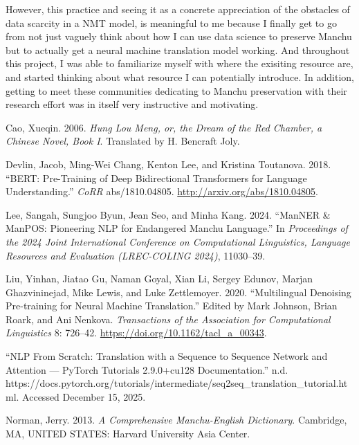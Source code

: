 \documentclass[
  letterpaper,
  DIV=11,
  numbers=noendperiod]{scrartcl}
\newlength{\cslhangindent}
\newenvironment{CSLReferences}[2] %
 {\begin{list}{}{%
  \setlength{\itemindent}{0pt}
  \setlength{\leftmargin}{0pt}
  \setlength{\parsep}{0pt}
  \ifodd #1
   \setlength{\leftmargin}{\cslhangindent}
   \setlength{\itemindent}{-1\cslhangindent}
  \fi
  \setlength{\itemsep}{#2\baselineskip}}}
 {\end{list}}
\begin{document}
However, this practice and seeing it as a concrete appreciation of the
obstacles of data scarcity in a NMT model, is meaningful to me because I
finally get to go from not just vaguely think about how I can use data
science to preserve Manchu but to actually get a neural machine
translation model working. And throughout this project, I was able to
familiarize myself with where the exisiting resource are, and started
thinking about what resource I can potentially introduce. In addition,
getting to meet these communities dedicating to Manchu preservation with
their research effort was in itself very instructive and motivating.

\label{refs}
\begin{CSLReferences}{1}{0}
Cao, Xueqin. 2006. \emph{Hung {Lou Meng}, or, the {Dream} of the {Red
Chamber}, a {Chinese Novel}, {Book I}}. Translated by H. Bencraft Joly.

Devlin, Jacob, Ming-Wei Chang, Kenton Lee, and Kristina Toutanova. 2018.
{``{BERT:} Pre-Training of Deep Bidirectional Transformers for Language
Understanding.''} \emph{CoRR} abs/1810.04805.
\url{http://arxiv.org/abs/1810.04805}.

Lee, Sangah, Sungjoo Byun, Jean Seo, and Minha Kang. 2024. {``{ManNER}
\& {ManPOS}: {Pioneering NLP} for Endangered {Manchu} Language.''} In
\emph{Proceedings of the 2024 {Joint International Conference} on
{Computational Linguistics}, {Language Resources} and {Evaluation}
({LREC-COLING} 2024)}, 11030--39.

Liu, Yinhan, Jiatao Gu, Naman Goyal, Xian Li, Sergey Edunov, Marjan
Ghazvininejad, Mike Lewis, and Luke Zettlemoyer. 2020. {``Multilingual
{Denoising Pre-training} for {Neural Machine Translation}.''} Edited by
Mark Johnson, Brian Roark, and Ani Nenkova. \emph{Transactions of the
Association for Computational Linguistics} 8: 726--42.
\url{https://doi.org/10.1162/tacl_a_00343}.

{``{NLP From Scratch}: {Translation} with a {Sequence} to {Sequence
Network} and {Attention} --- {PyTorch Tutorials} 2.9.0+cu128
Documentation.''} n.d.
https://docs.pytorch.org/tutorials/intermediate/seq2seq\_translation\_tutorial.html.
Accessed December 15, 2025.

Norman, Jerry. 2013. \emph{A {Comprehensive Manchu-English Dictionary}}.
Cambridge, MA, UNITED STATES: Harvard University Asia Center.


\end{CSLReferences}
\end{document}

